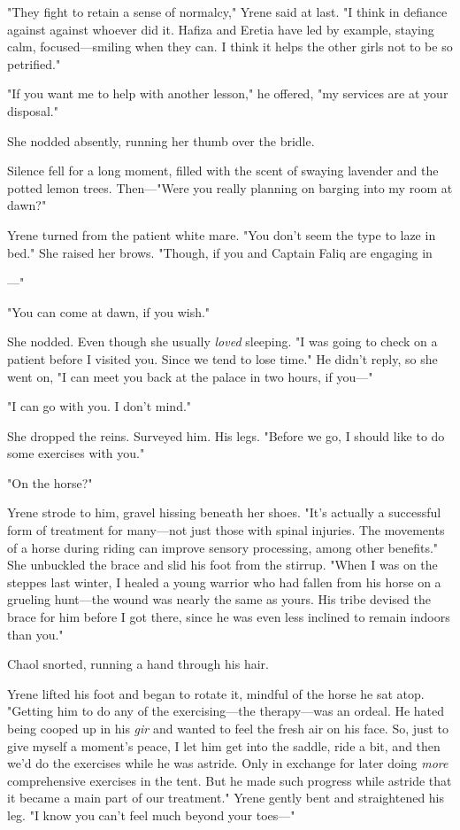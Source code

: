 "They fight to retain a sense of normalcy," Yrene said at last. "I think in defiance against  against whoever did it. Hafiza and Eretia have led by example, staying calm, focused---smiling when they can. I think it helps the other girls not to be so petrified."

"If you want me to help with another lesson," he offered, "my services are at your disposal."

She nodded absently, running her thumb over the bridle.

Silence fell for a long moment, filled with the scent of swaying lavender and the potted lemon trees. Then---"Were you really planning on barging into my room at dawn?"

Yrene turned from the patient white mare. "You don't seem the type to laze in bed." She raised her brows. "Though, if you and Captain Faliq are engaging in

---"

"You can come at dawn, if you wish."

She nodded. Even though she usually \emph{loved} sleeping. "I was going to check on a patient before I visited you. Since we tend to 
lose time." He didn't reply, so she went on, "I can meet you back at the palace in two hours, if you---"

"I can go with you. I don't mind."

She dropped the reins. Surveyed him. His legs. "Before we go, I should like to do some exercises with you."

"On the horse?"

Yrene strode to him, gravel hissing beneath her shoes. "It's actually a successful form of treatment for many---not just those with spinal injuries. The movements of a horse during riding can improve sensory processing, among other benefits." She unbuckled the brace and slid his foot from the stirrup. "When I was on the steppes last winter, I healed a young warrior who had fallen from his horse on a grueling hunt---the wound was nearly the same as yours. His tribe devised the brace for him before I got there, since he was even less inclined to remain indoors than you."

Chaol snorted, running a hand through his hair.

Yrene lifted his foot and began to rotate it, mindful of the horse he sat atop. "Getting him to do any of the exercising---the therapy---was an ordeal. He hated being cooped up in his \emph{gir} and wanted to feel the fresh air on his face. So, just to give myself a moment's peace, I let him get into the saddle, ride a bit, and then we'd do the exercises while he was astride. Only in exchange for later doing \emph{more}
comprehensive exercises in the tent. But he made such progress while astride that it became a main part of our treatment." Yrene gently bent and straightened his leg. "I know you can't feel much beyond your toes---"

